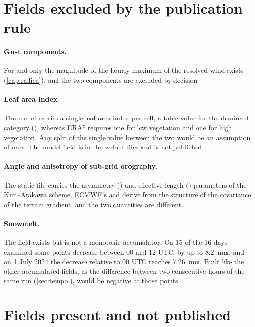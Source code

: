\section{Fields excluded by the publication rule}
\label{sec:esclusi}

\paragraph{Gust components.} For  and  only the magnitude of the hourly
maximum of the resolved wind exists (\cref{cap:raffica}), and the two components are excluded by
decision.

\paragraph{Leaf area index.} The model carries a single leaf area index per cell, a table value for
the dominant category (), whereas ERA5 requires one for low vegetation and one
for high vegetation. Any split of the single value between the two would be an assumption of ours.
The model field  is in the wrfout files and is not published.

\paragraph{Angle and anisotropy of sub-grid orography.} The static file carries the asymmetry
() and effective length () parameters of the Kim--Arakawa scheme. ECMWF's
 and  derive from the structure of the covariance of the terrain gradient,
and the two quantities are different.

\paragraph{Snowmelt.} The field  exists but is not a monotonic accumulator. On 15 of the
16 days examined some points decrease between 00 and 12 UTC, by up to \SI{8.2}{mm}, and on 1 July
2024 the decrease relative to 00 UTC reaches \SI{7.26}{mm}. Built like the other accumulated
fields, as the difference between two consecutive hours of the same run (\cref{sec:tempo}),
 would be negative at those points.

\section{Fields present and not published}
\label{sec:non-pubblicati}

